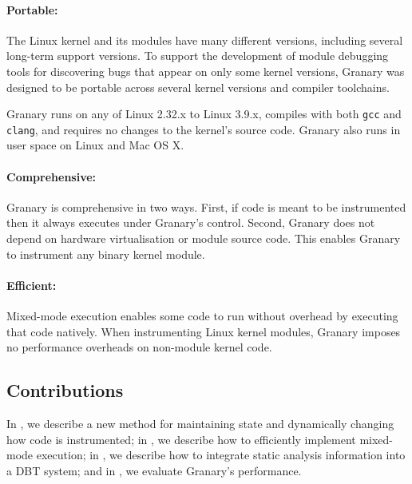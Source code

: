 \documentclass[letterpaper,twocolumn,10pt]{article}
\begin{document}

\paragraph{Portable:} The Linux kernel and its modules have many different versions, including several long-term support  versions. To support the development of module debugging tools for discovering bugs that appear on only some kernel versions, Granary was designed to be portable across several kernel versions and compiler toolchains.

Granary runs on any of Linux 2.32.x to Linux 3.9.x, compiles with both \texttt{gcc} and \texttt{clang}, and requires no changes to the kernel's source code. Granary also runs in user space on Linux and Mac OS X.

\paragraph{Comprehensive:} Granary is comprehensive in two ways. First, if code is meant to be instrumented then it always executes under Granary's control. Second, Granary does not depend on hardware virtualisation or module source code. This enables Granary to instrument any binary kernel module.

\paragraph{Efficient:} Mixed-mode execution enables some code to run without overhead by executing that code natively. When instrumenting Linux kernel modules, Granary imposes no performance overheads on non-module kernel code.


\subsection{Contributions}\label{sec:contrib}
In , we describe a new method for maintaining state and dynamically changing how code is instrumented; in , we describe how to efficiently implement mixed-mode execution; in , we describe how to integrate static analysis information into a DBT system; and in , we evaluate Granary's performance.
\end{document}
